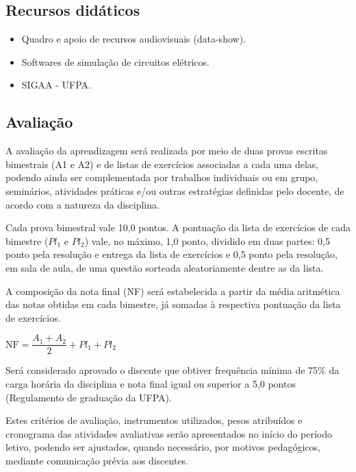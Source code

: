\documentclass[oneside,a4paper,12pt]{article}
\begin{document}
  \begin{snugshade}
  \section{Recursos didáticos} %
  \end{snugshade}
    \begin{itemize}
	  \item Quadro e apoio de recursos audiovisuais (data-show).
	  \item Softwares de simulação de circuitos elétricos.
	  \item SIGAA - UFPA.
    \end{itemize}
  \begin{snugshade}
\section{Avaliação}
\end{snugshade}

A avaliação da aprendizagem será realizada por meio de duas provas escritas bimestrais (A1 e A2) e de listas de exercícios associadas a cada uma delas, podendo ainda ser complementada por trabalhos individuais ou em grupo, seminários, atividades práticas e/ou outras estratégias definidas pelo docente, de acordo com a natureza da disciplina.

Cada prova bimestral vale 10,0 pontos. A pontuação da lista de exercícios de cada bimestre ($Pl_1$ e $Pl_2$) vale, no máximo, 1,0 ponto, dividido em duas partes: 0,5 ponto pela resolução e entrega da lista de exercícios e 0,5 ponto pela resolução, em sala de aula, de uma questão sorteada aleatoriamente dentre as da lista.

A composição da nota final (NF) será estabelecida a partir da média aritmética das notas obtidas em cada bimestre, já somadas à respectiva pontuação da lista de exercícios.

\begin{center}
$\mathrm{NF} = \dfrac{A_1 + A_2}{2} + Pl_1 + Pl_2$
\end{center}



Será considerado aprovado o discente que obtiver frequência mínima de 75\% da carga horária da disciplina e nota final igual ou superior a 5,0 pontos (Regulamento de graduação da UFPA).

Estes critérios de avaliação, instrumentos utilizados, pesos atribuídos e cronograma das atividades avaliativas serão apresentados no início do período letivo, podendo ser ajustados, quando necessário, por motivos pedagógicos, mediante comunicação prévia aos discentes.
\end{document}
